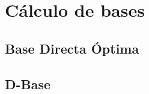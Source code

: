 \section{C\'alculo de bases}

\subsection{Base Directa \'Optima}

 
\newpage

\subsection{D-Base}

 
\newpage